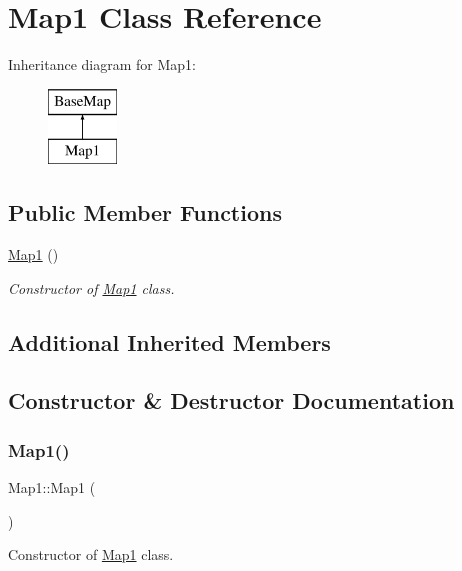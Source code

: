 \hypertarget{class_map1}{}\section{Map1 Class Reference}
\label{class_map1}
Inheritance diagram for Map1\+:\begin{figure}[H]
\begin{center}
\leavevmode
\includegraphics[height=2.000000cm]{class_map1}
\end{center}
\end{figure}
\subsection*{Public Member Functions}
\begin{DoxyCompactItemize}
\item 
\hyperlink{class_map1_a906bd64b53d0bc4cd04ce143fe2f9d2b}{Map1} ()
\begin{DoxyCompactList}\small\item\em Constructor of \hyperlink{class_map1}{Map1} class. \end{DoxyCompactList}\end{DoxyCompactItemize}
\subsection*{Additional Inherited Members}


\subsection{Constructor \& Destructor Documentation}
\mbox{\label{class_map1_a906bd64b53d0bc4cd04ce143fe2f9d2b}} 
\subsubsection{\texorpdfstring{Map1()}{Map1()}}
{\footnotesize\ttfamily Map1\+::\+Map1 (\begin{DoxyParamCaption}{ }\end{DoxyParamCaption})}



Constructor of \hyperlink{class_map1}{Map1} class. 


